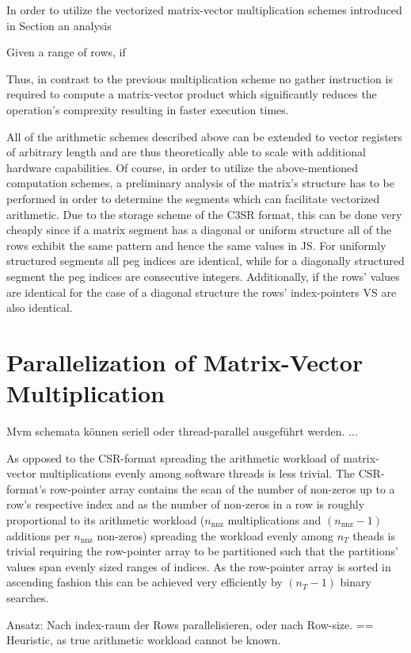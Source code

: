       In order to utilize the vectorized matrix-vector multiplication schemes introduced in Section
       an analysis

      Given a range of rows, if 




       Thus, in contrast to the previous multiplication scheme no gather instruction is required to compute a
       matrix-vector product which significantly reduces the operation's comprexity resulting in faster execution times.


      All of the arithmetic schemes described above can be extended to vector registers of arbitrary length and are thus
      theoretically able to scale with additional hardware capabilities. Of course, in order to utilize the
      above-mentioned computation schemes, a preliminary analysis of the matrix's structure has to be performed in order
      to determine the segments which can facilitate vectorized arithmetic. Due to the storage scheme of the C3SR
      format, this can be done very cheaply since if a matrix segment has a diagonal or uniform structure all of the
      rows exhibit the same pattern and hence the same values in JS. For uniformly structured segments all peg indices
      are identical, while for a diagonally structured segment the peg indices are consecutive integers. Additionally,
      if the rows' values are identical for the case of a diagonal structure the rows' index-pointers VS are also
      identical.

    \section{Parallelization of Matrix-Vector Multiplication}

      Mvm schemata können seriell oder thread-parallel ausgeführt werden. ... 

      As opposed to the CSR-format spreading the arithmetic workload of matrix-vector multiplications evenly among
      software threads is less trivial. The CSR-format's row-pointer array contains the scan of the number of non-zeros
      up to a row's respective index and as the number of non-zeros in a row is roughly proportional to its arithmetic
      workload ($n_\text{nnz}$ multiplications and $(n_\text{nnz} - 1)$ additions per $n_\text{nnz}$ non-zeros)
      spreading the workload evenly among $n_T$ theads is trivial requiring the row-pointer array to be partitioned such
      that the partitions' values span evenly sized ranges of indices. As the row-pointer array is sorted in ascending
      fashion this can be achieved very efficiently by $(n_T - 1)$ binary searches.

      Ansatz: Nach index-raum der Rows parallelisieren, oder nach Row-size. == Heuristic, as true arithmetic workload
      cannot be known.
